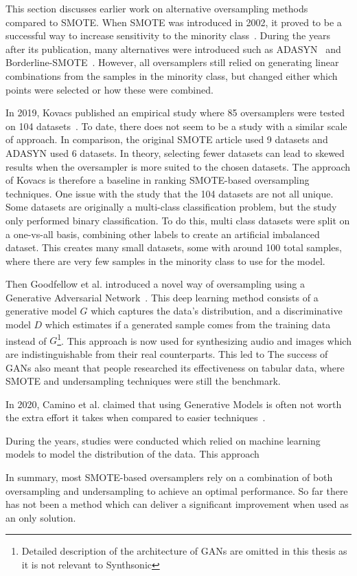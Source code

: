 This section discusses earlier work on alternative oversampling methods compared to SMOTE. When SMOTE was introduced in 2002, it proved to be a successful way to increase sensitivity to the minority class~\cite{Chawla2002SMOTE:Technique}. During the years after its publication, many alternatives were introduced such as ADASYN~\cite{He2008ADASYN:Learning} and Borderline-SMOTE~\cite{Han2005Borderline-SMOTE:Learning}. However, all oversamplers still relied on generating linear combinations from the samples in the minority class, but changed either which points were selected or how these were combined. 

In 2019, Kovacs published an empirical study where 85 oversamplers were tested on 104 datasets~\cite{Kovacs2019AnDatasets}. To date, there does not seem to be a study with a similar scale of approach. In comparison, the original SMOTE article used 9 datasets and ADASYN used 6 datasets. In theory, selecting fewer datasets can lead to skewed results when the oversampler is more suited to the chosen datasets. The approach of Kovacs is therefore a baseline in ranking SMOTE-based oversampling techniques. One issue with the study that the 104 datasets are not all unique. Some datasets are originally a multi-class classification problem, but the study only performed binary classification. To do this, multi class datasets were split on a one-vs-all basis, combining other labels to create an artificial imbalanced dataset. This creates many small datasets, some with around 100 total samples, where there are very few samples in the minority class to use for the model.

Then Goodfellow et al. introduced a novel way of oversampling using a Generative Adversarial Network~\cite{Goodfellow2014GenerativeNets}. This deep learning method consists of a generative model $G$ which captures the data's distribution, and a discriminative model $D$ which estimates if a generated sample comes from the training data instead of $G$\footnote{Detailed description of the architecture of GANs are omitted in this thesis as it is not relevant to Synthsonic}. This approach is now used for synthesizing audio and images which are indistinguishable from their real counterparts. This led to  The success of GANs also meant that people researched its effectiveness on tabular data, where SMOTE and undersampling techniques were still the benchmark. 


In 2020, Camino et al. claimed that using Generative Models is often not worth the extra effort it takes when compared to easier techniques~\cite{CaminoOversamplingEffort}.


During the years, studies were conducted which relied on machine learning models to model the distribution of the data. This approach 

In summary, most SMOTE-based oversamplers rely on a combination of both oversampling and undersampling to achieve an optimal performance. So far there has not been a method which can deliver a significant improvement when used as an only solution. 